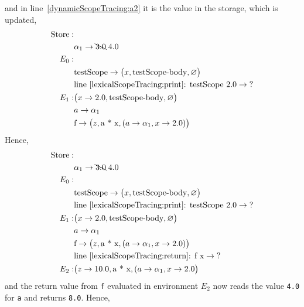 and in line~\ref{dynamicScopeTracing:a2} it is the value in the storage, which is updated,
\begin{align*}
  \text{Store}: &\\
  & \alpha_1 \rightarrow \bcancel{3.0}\; 4.0\\
  E_0:&\\
      &\text{testScope} \rightarrow \big(x, \text{testScope-body}, \varnothing\big)\\
      & \text{line~\ref{lexicalScopeTracing:print}: testScope 2.0} \rightarrow \text{?}\\
  E_1: & \big(x\rightarrow 2.0, \text{testScope-body}, \varnothing\big)\\
      & a \rightarrow \alpha_1\\
      & \text{f} \rightarrow \big(z, \text{a * x}, (a \rightarrow \alpha_1, x\rightarrow 2.0)\big)\\
\end{align*}
Hence,
\begin{align*}
  \text{Store}: &\\
  & \alpha_1 \rightarrow \bcancel{3.0}\; 4.0\\
  E_0:&\\
      &\text{testScope} \rightarrow \big(x, \text{testScope-body}, \varnothing\big)\\
      & \text{line~\ref{lexicalScopeTracing:print}: testScope 2.0} \rightarrow \text{?}\\
  E_1: & \big(x\rightarrow 2.0, \text{testScope-body}, \varnothing\big)\\
      & a \rightarrow \alpha_1\\
      & \text{f} \rightarrow \big(z, \text{a * x}, (a \rightarrow \alpha_1, x\rightarrow 2.0)\big)\\
      & \text{line~\ref{lexicalScopeTracing:return}: f x} \rightarrow \text{?}\\
  E_2: & \big(z \rightarrow 10.0, \text{a * x}, (a \rightarrow \alpha_1, x\rightarrow 2.0\big)\\
\end{align*}
and the return value from \lstinline!f! evaluated in environment $E_2$ now reads the value \lstinline!4.0! for \lstinline!a! and returns \lstinline!8.0!. Hence,
